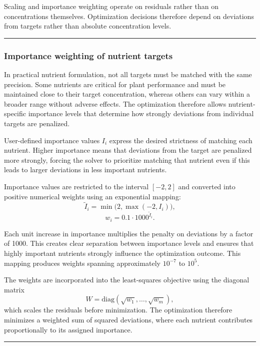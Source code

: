 \documentclass[
  letterpaper,
  DIV=11,
  numbers=noendperiod]{scrreprt}
\begin{document}
Scaling and importance weighting operate on residuals rather than on
concentrations themselves. Optimization decisions therefore depend on
deviations from targets rather than absolute concentration levels.

\begin{center}\rule{0.5\linewidth}{0.5pt}\end{center}

\subsubsection{Importance weighting of nutrient
targets}\label{importance-weighting-of-nutrient-targets}

In practical nutrient formulation, not all targets must be matched with
the same precision. Some nutrients are critical for plant performance
and must be maintained close to their target concentration, whereas
others can vary within a broader range without adverse effects. The
optimization therefore allows nutrient-specific importance levels that
determine how strongly deviations from individual targets are penalized.

User-defined importance values \(I_i\) express the desired strictness of
matching each nutrient. Higher importance means that deviations from the
target are penalized more strongly, forcing the solver to prioritize
matching that nutrient even if this leads to larger deviations in less
important nutrients.

Importance values are restricted to the interval \([-2,2]\) and
converted into positive numerical weights using an exponential mapping:
\[
\tilde I_i = \min\!\bigl(2,\max(-2,I_i)\bigr),
\] \[
w_i = 0.1 \cdot 1000^{\tilde I_i}.
\]

Each unit increase in importance multiplies the penalty on deviations by
a factor of 1000. This creates clear separation between importance
levels and ensures that highly important nutrients strongly influence
the optimization outcome. This mapping produces weights spanning
approximately \(10^{-7}\) to \(10^{5}\).

The weights are incorporated into the least-squares objective using the
diagonal matrix \[
W = \mathrm{diag}\!\left(\sqrt{w_1},\ldots,\sqrt{w_m}\right),
\] which scales the residuals before minimization. The optimization
therefore minimizes a weighted sum of squared deviations, where each
nutrient contributes proportionally to its assigned importance.

\begin{center}\rule{0.5\linewidth}{0.5pt}\end{center}
\end{document}
